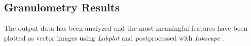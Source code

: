 \documentclass{article}
\begin{document}
    \clearpage

    \subsection{Granulometry Results\label{Granulometry_results}}
      
      The output data has been analyzed and the most meaningful features have been plotted as vector images using \textit{Labplot} \autocites{Labplot} and 
      postprocessed with \textit{Inkscape} \autocites{Inkscape}. \\ 
  
\end{document}
